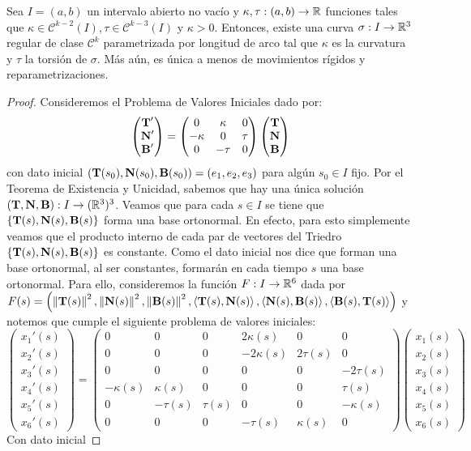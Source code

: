 \begin{teo}
Sea $I=(a,b)$ un intervalo abierto no vacío y $\kappa,\tau:(a,b)\to\mathbb{R}$ funciones tales que $\kappa\in\mathscr{C}^{k-2}(I),\tau\in\mathscr{C}^{k-3}(I)$ y $\kappa>0$. Entonces, existe una curva $\sigma:I\to\mathbb{R}^3$ regular de clase $\mathscr{C}^k$ parametrizada por longitud de arco tal que $\kappa$ es la curvatura y $\tau$ la torsión de $\sigma$. Más aún, es única a menos de movimientos rígidos y reparametrizaciones.
\begin{proof}
Consideremos el Problema de Valores Iniciales dado por: $$\begin{pmatrix}\operatorname{\mathbf{T}}' \\ \operatorname{\mathbf{N}}'\\ \operatorname{\mathbf{B}}'\end{pmatrix} = \begin{pmatrix}0& \kappa & 0 \\ -\kappa & 0 & \tau \\ 0 & -\tau & 0\end{pmatrix}\begin{pmatrix}\operatorname{\mathbf{T}} \\ \operatorname{\mathbf{N}} \\ \operatorname{\mathbf{B}}\end{pmatrix}$$ con dato inicial $(\operatorname{\mathbf{T}}(s_0),\operatorname{\mathbf{N}}(s_0),\operatorname{\mathbf{B}}(s_0))=(e_1,e_2,e_3)$ para algún $s_0\in I$ fijo. Por el Teorema de Existencia y Unicidad, sabemos que hay una única solución $(\operatorname{\mathbf{T}},\operatorname{\mathbf{N}},\operatorname{\mathbf{B}}):I\to(\mathbb{R}^3)^3$. Veamos que para cada $s\in I$ se tiene que $\{\operatorname{\mathbf{T}}(s),\operatorname{\mathbf{N}}(s),\operatorname{\mathbf{B}}(s)\}$ forma una base ortonormal. En efecto, para esto simplemente veamos que el producto interno de cada par de vectores del Triedro $\{\operatorname{\mathbf{T}}(s),\operatorname{\mathbf{N}}(s),\operatorname{\mathbf{B}}(s)\}$ es constante. Como el dato inicial nos dice que forman una base ortonormal, al ser constantes, formarán en cada tiempo $s$ una base ortonormal. Para ello, consideremos la función $F:I\to\mathbb{R}^6$ dada por $F(s)=\left(\left\| \operatorname{\mathbf{T}}(s) \right\|^2,\left\| \operatorname{\mathbf{N}}(s) \right\|^2,\left\| \operatorname{\mathbf{B}}(s) \right\|^2,\left\langle \operatorname{\mathbf{T}}(s),\operatorname{\mathbf{N}}(s) \right\rangle,\left\langle \operatorname{\mathbf{N}}(s),\operatorname{\mathbf{B}}(s) \right\rangle,\left\langle \operatorname{\mathbf{B}}(s),\operatorname{\mathbf{T}}(s) \right\rangle\right)$ y notemos que cumple el siguiente problema de valores iniciales: $$\begin{pmatrix}x_1'(s)\\ x_2'(s)\\x_3'(s)\\x_4'(s)\\x_5'(s)\\x_6'(s)\end{pmatrix} = \begin{pmatrix}0&0&0&2\kappa(s)&0&0\\ 0&0&0&-2\kappa(s)&2\tau(s)&0\\ 0&0&0&0&0&-2\tau(s)\\ -\kappa(s)&\kappa(s)&0&0&0&\tau(s)\\ 0&-\tau(s)&\tau(s)&0&0&-\kappa(s)\\0&0&0&-\tau(s)&\kappa(s)&0\end{pmatrix}\begin{pmatrix}x_1(s)\\ x_2(s)\\x_3(s)\\x_4(s)\\x_5(s)\\x_6(s)\end{pmatrix}$$ Con dato inicial 
\end{proof}
\end{teo}
